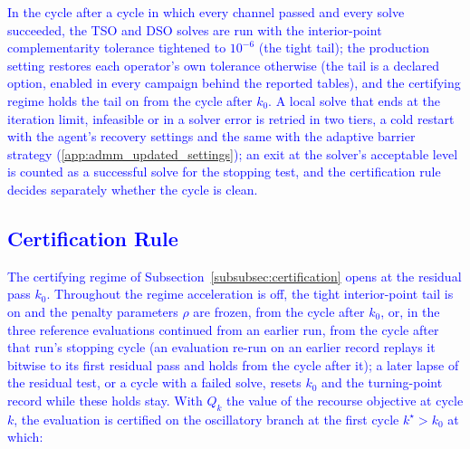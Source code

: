 \documentclass[preprint,12pt]{elsarticle}
\begin{document}
\textcolor{blue}{
    In the cycle after a cycle in which every channel passed and every solve succeeded, the TSO and DSO solves are run with the interior-point complementarity tolerance tightened to $10^{-6}$ (the tight tail); the production setting restores each operator's own tolerance otherwise (the tail is a declared option, enabled in every campaign behind the reported tables), and the certifying regime holds the tail on from the cycle after $k_0$. A local solve that ends at the iteration limit, infeasible or in a solver error is retried in two tiers, a cold restart with the agent's recovery settings and the same with the adaptive barrier strategy (\ref{app:admm_updated_settings}); an exit at the solver's acceptable level is counted as a successful solve for the stopping test, and the certification rule decides separately whether the cycle is clean.
}

\subsection{\textcolor{blue}{Certification Rule}}
\label{app:admm_updated_certification}

\textcolor{blue}{
    The certifying regime of Subsection~\ref{subsubsec:certification} opens at the residual pass $k_0$. Throughout the regime acceleration is off, the tight interior-point tail is on and the penalty parameters $\rho$ are frozen, from the cycle after $k_0$, or, in the three reference evaluations continued from an earlier run, from the cycle after that run's stopping cycle (an evaluation re-run on an earlier record replays it bitwise to its first residual pass and holds from the cycle after it);
    a later lapse of the residual test, or a cycle with a failed solve, resets $k_0$ and the turning-point record while these holds stay. With $Q_k$ the value of the recourse objective at cycle $k$, the evaluation is certified on the oscillatory branch at the first cycle $k^{\star} > k_0$ at which:
}
\end{document}
